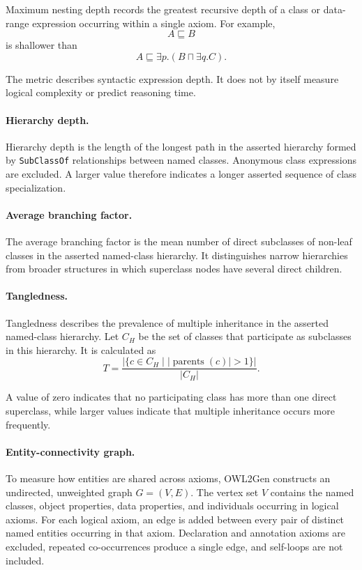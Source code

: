 Maximum nesting depth records the greatest recursive depth of a class or
data-range expression occurring within a single axiom. For example,
\[
A\sqsubseteq B
\]
is shallower than
\[
A\sqsubseteq\exists p.(B\sqcap\exists q.C).
\]

The metric describes syntactic expression depth. It does not by itself
measure logical complexity or predict reasoning time.


\paragraph{Hierarchy depth.}

Hierarchy depth is the length of the longest path in the asserted hierarchy
formed by \texttt{SubClassOf} relationships between named classes.
Anonymous class expressions are excluded. A larger value therefore
indicates a longer asserted sequence of class specialization.


\paragraph{Average branching factor.}

The average branching factor is the mean number of direct subclasses of
non-leaf classes in the asserted named-class hierarchy. It distinguishes
narrow hierarchies from broader structures in which superclass nodes have
several direct children.


\paragraph{Tangledness.}

Tangledness describes the prevalence of multiple inheritance in the
asserted named-class hierarchy. Let $C_H$ be the set of classes that
participate as subclasses in this hierarchy. It is calculated as
\[
T=
\frac{
|\{c\in C_H\mid |\operatorname{parents}(c)|>1\}|
}{
|C_H|
}.
\]

A value of zero indicates that no participating class has more than one
direct superclass, while larger values indicate that multiple inheritance
occurs more frequently.


\paragraph{Entity-connectivity graph.}

To measure how entities are shared across axioms, OWL2Gen constructs an
undirected, unweighted graph $G=(V,E)$. The vertex set $V$ contains the
named classes, object properties, data properties, and individuals
occurring in logical axioms. For each logical axiom, an edge is added
between every pair of distinct named entities occurring in that axiom.
Declaration and annotation axioms are excluded, repeated co-occurrences
produce a single edge, and self-loops are not included.

